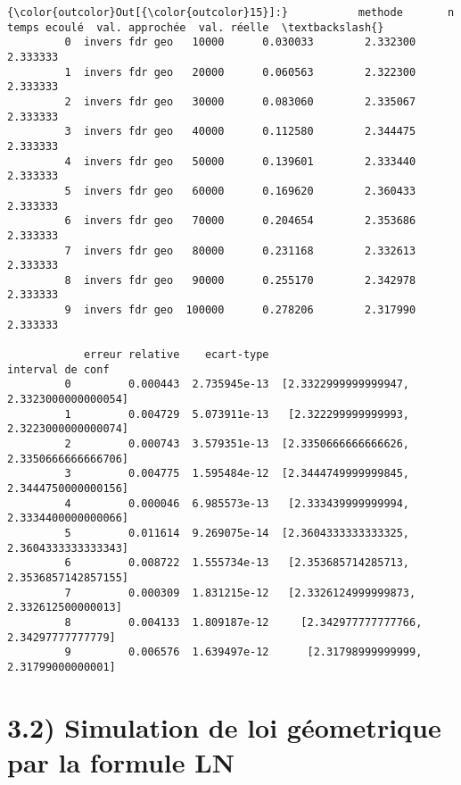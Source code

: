 \documentclass[11pt]{article}
\begin{document}
            \begin{Verbatim}[commandchars=\\\{\}]
{\color{outcolor}Out[{\color{outcolor}15}]:}           methode       n  temps ecoulé  val. approchée  val. réelle  \textbackslash{}
         0  invers fdr geo   10000      0.030033        2.332300     2.333333   
         1  invers fdr geo   20000      0.060563        2.322300     2.333333   
         2  invers fdr geo   30000      0.083060        2.335067     2.333333   
         3  invers fdr geo   40000      0.112580        2.344475     2.333333   
         4  invers fdr geo   50000      0.139601        2.333440     2.333333   
         5  invers fdr geo   60000      0.169620        2.360433     2.333333   
         6  invers fdr geo   70000      0.204654        2.353686     2.333333   
         7  invers fdr geo   80000      0.231168        2.332613     2.333333   
         8  invers fdr geo   90000      0.255170        2.342978     2.333333   
         9  invers fdr geo  100000      0.278206        2.317990     2.333333   
         
            erreur relative    ecart-type                          interval de conf  
         0         0.000443  2.735945e-13  [2.3322999999999947, 2.3323000000000054]  
         1         0.004729  5.073911e-13   [2.322299999999993, 2.3223000000000074]  
         2         0.000743  3.579351e-13  [2.3350666666666626, 2.3350666666666706]  
         3         0.004775  1.595484e-12  [2.3444749999999845, 2.3444750000000156]  
         4         0.000046  6.985573e-13   [2.333439999999994, 2.3334400000000066]  
         5         0.011614  9.269075e-14  [2.3604333333333325, 2.3604333333333343]  
         6         0.008722  1.555734e-13   [2.353685714285713, 2.3536857142857155]  
         7         0.000309  1.831215e-12   [2.3326124999999873, 2.332612500000013]  
         8         0.004133  1.809187e-12     [2.342977777777766, 2.34297777777779]  
         9         0.006576  1.639497e-12      [2.31798999999999, 2.31799000000001]  
\end{Verbatim}
        
    \section{3.2) Simulation de loi géometrique par la formule
LN}\label{simulation-de-loi-guxe9ometrique-par-la-formule-ln}
\end{document}
